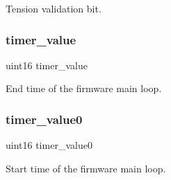 Tension validation bit. \mbox{\label{globals_8c_a2c95347784600e4a45d481b37eeeef4b}} 
\subsubsection{timer\+\_\+value}
{\footnotesize\ttfamily uint16 timer\+\_\+value}

End time of the firmware main loop. \mbox{\label{globals_8c_a82c5883d1d4a600a1073686f917a812d}} 
\subsubsection{timer\+\_\+value0}
{\footnotesize\ttfamily uint16 timer\+\_\+value0}

Start time of the firmware main loop. 